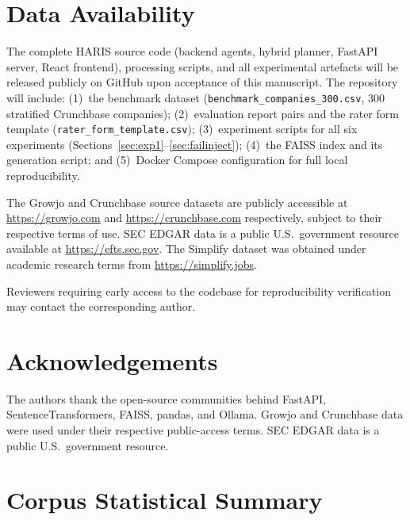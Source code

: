 \documentclass[preprint,12pt]{elsarticle}
\begin{document}
\section*{Data Availability}

The complete HARIS source code (backend agents, hybrid planner, FastAPI server,
React frontend), processing scripts, and all experimental artefacts will be
released publicly on GitHub upon acceptance of this manuscript. The repository
will include: (1)~the benchmark dataset (\texttt{benchmark\_companies\_300.csv},
300 stratified Crunchbase companies); (2)~evaluation report pairs and the
rater form template (\texttt{rater\_form\_template.csv}); (3)~experiment scripts
for all six experiments (Sections~\ref{sec:exp1}--\ref{sec:failinject});
(4)~the FAISS index and its generation script; and (5)~Docker Compose
configuration for full local reproducibility.

The Growjo and Crunchbase source datasets are publicly accessible at
\url{https://growjo.com} and \url{https://crunchbase.com} respectively, subject
to their respective terms of use. SEC EDGAR data is a public U.S.\ government
resource available at \url{https://efts.sec.gov}. The Simplify dataset was
obtained under academic research terms from \url{https://simplify.jobs}.

Reviewers requiring early access to the codebase for reproducibility verification
may contact the corresponding author.

\section*{Acknowledgements}

The authors thank the open-source communities behind FastAPI,
SentenceTransformers, FAISS, pandas, and Ollama. Growjo and Crunchbase data were
used under their respective public-access terms. SEC EDGAR data is a public
U.S.\ government resource.




\appendix

\section{Corpus Statistical Summary}
\end{document}
